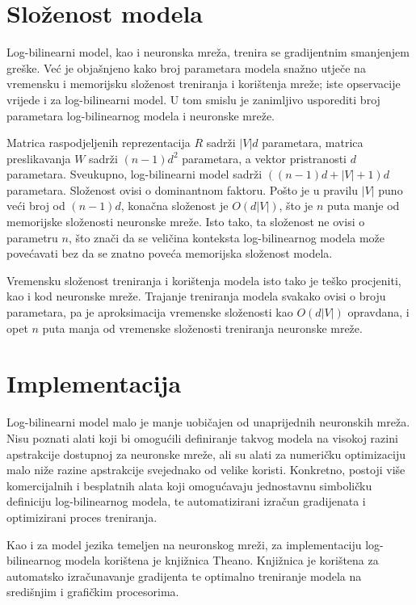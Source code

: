 \documentclass[times, utf8, diplomski, numeric]{fer}
\begin{document}
\section{Složenost modela}

Log-bilinearni model, kao i neuronska mreža, trenira se gradijentnim smanjenjem greške. Već je objašnjeno kako broj parametara modela snažno utječe na vremensku i memorijsku složenost treniranja i korištenja mreže; iste opservacije vrijede i za log-bilinearni model. U tom smislu je zanimljivo usporediti broj parametara log-bilinearnog modela i neuronske mreže.

Matrica raspodjeljenih reprezentacija $R$ sadrži $|V| d$ parametara, matrica preslikavanja $W$ sadrži $(n - 1) d^2$ parametara, a vektor pristranosti $d$ parametara. Sveukupno, log-bilinearni model sadrži $\left((n - 1) d + |V| + 1\right) d$ parametara. Složenost ovisi o dominantnom faktoru. Pošto je u pravilu $|V|$ puno veći broj od $(n - 1) d$, konačna složenost je $O(d |V|)$, što je $n$ puta manje od memorijske složenosti neuronske mreže. Isto tako, ta složenost ne ovisi o parametru $n$, što znači da se veličina konteksta log-bilinearnog modela može povećavati bez da se znatno poveća memorijska složenost modela.

Vremensku složenost treniranja i korištenja modela isto tako je teško procjeniti, kao i kod neuronske mreže. Trajanje treniranja modela svakako ovisi o broju parametara, pa je aproksimacija vremenske složenosti kao $O(d |V|)$ opravdana, i opet $n$ puta manja od vremenske složenosti treniranja neuronske mreže.

\section{Implementacija}

Log-bilinearni model malo je manje uobičajen od unaprijednih neuronskih mreža. Nisu poznati alati koji bi omogućili definiranje takvog modela na visokoj razini apstrakcije dostupnoj za neuronske mreže, ali su alati za numeričku optimizaciju malo niže razine apstrakcije svejednako od velike koristi. Konkretno, postoji više komercijalnih i besplatnih alata koji omogućavaju jednostavnu simboličku definiciju log-bilinearnog modela, te automatizirani izračun gradijenata i optimizirani proces treniranja.

Kao i za model jezika temeljen na neuronskog mreži, za implementaciju log-bilinearnog modela korištena je knjižnica Theano. Knjižnica je korištena za automatsko izračunavanje gradijenta te optimalno treniranje modela na središnjim i grafičkim procesorima.
\end{document}
